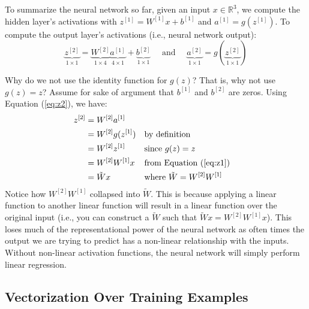 \documentclass{article}
\numberwithin{equation}{section}
\begin{document}
To summarize the neural network so far, given an input $x \in \mathbb{R}^3$, we compute the hidden layer's activations with $z^{[1]} = W^{[1]} x + b^{[1]}$ and $a^{[1]} = g(z^{[1]})$. To compute the output layer's activations (i.e., neural network output):
\begin{equation}\label{eq:z2}
\underbrace{ z^{[2]} }_{1\times 1} = \underbrace{ W^{[2]} }_{1\times 4} \underbrace{ a^{[1]} }_{4\times 1} + \underbrace{ b^{[2]} }_{1\times 1} \quad \textrm{ and } \quad \underbrace{ a^{[2]} }_{1\times 1} = g(\underbrace{ z^{[2]} }_{1\times 1} )
\end{equation}

Why do we not use the identity function for $g(z)$? That is, why not use $g(z) = z$? Assume for sake of argument that $b^{[1]}$ and $b^{[2]}$ are zeros. Using Equation (\ref{eq:z2}), we have:
\begin{align}
z^{[2]} &= W^{[2]} a^{[1]} \\
&= W^{[2]} g(z^{[1]}) && \text{by definition}\\
&= W^{[2]} z^{[1]} && \text{since $g(z) = z$} \\
&= W^{[2]} W^{[1]} x && \text{from Equation (\ref{eq:z1})} \\
&= \tilde{W} x && \text{where $\tilde{W} = W^{[2]} W^{[1]}$ }
\end{align}
Notice how $W^{[2]} W^{[1]}$ collapsed into $\tilde{W}$.
This is because applying a linear function to another linear function will result in a linear function over the original input (i.e., you can construct a $\tilde{W}$ such that $\tilde{W}x = W^{[2]} W^{[1]} x$). This loses much of the representational power of the neural network as often times the output we are trying to predict has a non-linear relationship with the inputs. Without non-linear activation functions, the neural network will simply perform linear regression.

\subsection{Vectorization Over Training Examples}
\end{document}
